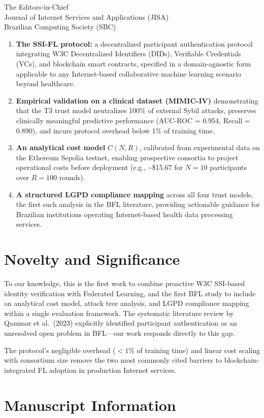 \documentclass[11pt]{letter}
\begin{document}
\begin{letter}{The Editors-in-Chief \\
Journal of Internet Services and Applications (JISA) \\
Brazilian Computing Society (SBC)}
\begin{enumerate}
  \item \textbf{The SSI-FL protocol:} a decentralized participant authentication protocol integrating W3C Decentralized Identifiers (DIDs), Verifiable Credentials (VCs), and blockchain smart contracts, specified in a domain-agnostic form applicable to any Internet-based collaborative machine learning scenario beyond healthcare.

  \item \textbf{Empirical validation on a clinical dataset (MIMIC-IV)} demonstrating that the T3 trust model neutralizes 100\% of external Sybil attacks, preserves clinically meaningful predictive performance (AUC-ROC = 0.954, Recall = 0.890), and incurs protocol overhead below 1\% of training time.

  \item \textbf{An analytical cost model} $C(N,R)$, calibrated from experimental data on the Ethereum Sepolia testnet, enabling prospective consortia to project operational costs before deployment (e.g., \textasciitilde\$15.67 for $N=10$ participants over $R=100$ rounds).

  \item \textbf{A structured LGPD compliance mapping} across all four trust models, the first such analysis in the BFL literature, providing actionable guidance for Brazilian institutions operating Internet-based health data processing services.
\end{enumerate}

\section*{Novelty and Significance}

To our knowledge, this is the first work to combine proactive W3C SSI-based identity verification with Federated Learning, and the first BFL study to include an analytical cost model, attack tree analysis, and LGPD compliance mapping within a single evaluation framework. The systematic literature review by Qammar et al.\ (2023) explicitly identified participant authentication as an unresolved open problem in BFL---our work responds directly to this gap.

The protocol's negligible overhead ($< 1\%$ of training time) and linear cost scaling with consortium size remove the two most commonly cited barriers to blockchain-integrated FL adoption in production Internet services.

\section*{Manuscript Information}


\end{letter}
\end{document}
